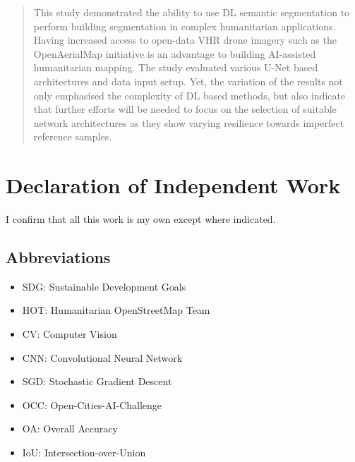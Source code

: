 \documentclass[11pt, a4paper, twoside]{report}
\begin{document}
\begin{abstract}
This study demonstrated the ability to use DL semantic segmentation to perform
building segmentation in complex humanitarian applications. Having increased access to
open-data VHR drone imagery such as the OpenAerialMap initiative is an advantage to
building AI-assisted humanitarian mapping. The study evaluated various U-Net based
architectures and data input setup. Yet, the variation of the results not only emphasised the
complexity of DL based methods, but also indicate that further efforts will be needed to
focus on the selection of suitable network architectures as they show varying resilience
towards imperfect reference samples.\\\par

\end{abstract}

\section{Declaration of Independent Work}

I confirm that all this work is my own except where indicated.

\newpage

\listoffigures

\newpage

\listoftables
\clearpage

\newpage

\subsection{Abbreviations}

\begin{itemize}
  \item SDG: Sustainable Development Goals
  \item HOT: Humanitarian OpenStreetMap Team
  \item CV: Computer Vision
  \item CNN: Convolutional Neural Network
  \item SGD: Stochastic Gradient Descent
  \item OCC: Open-Cities-AI-Challenge
  \item OA: Overall Accuracy
  \item IoU: Intersection-over-Union
\end{itemize}

\newpage

\end{document}
